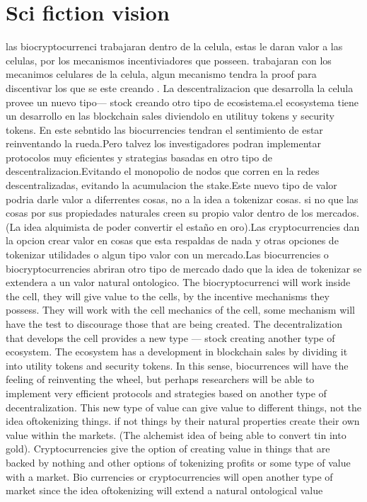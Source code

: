 \documentclass{article}
\begin{document}
\section{Sci fiction vision}
\label{sec:headings}
las biocryptocurrenci trabajaran dentro de la celula, estas le daran valor a las celulas, por los mecanismos incentiviadores que posseen.
trabajaran con los mecanimos celulares de la celula, algun mecanismo tendra la proof  para discentivar los que se este creando  . La descentralizacion que desarrolla la celula provee un nuevo tipo--- stock creando otro tipo de ecosistema.el ecosystema tiene un desarrollo en las blockchain sales diviendolo en utilituy tokens y security tokens. En este sebntido las biocurrencies tendran el sentimiento de estar reinventando la rueda.Pero talvez los investigadores podran implementar protocolos muy eficientes y strategias basadas en otro tipo de descentralizacion.Evitando el monopolio de nodos que corren en la redes descentralizadas, evitando la acumulacion the stake.Este nuevo tipo de valor podria darle valor a diferrentes cosas, no a la idea a tokenizar cosas. si no que las cosas por sus propiedades naturales creen su propio valor dentro de los mercados.(La idea alquimista de poder convertir el estaño en oro).Las cryptocurrencies dan la opcion crear valor en cosas que esta respaldas de nada y otras opciones de tokenizar utilidades o algun tipo valor con un mercado.Las biocurrencies o biocryptocurrencies abriran otro tipo de mercado dado que la idea de tokenizar se extendera a un valor natural ontologico.
The biocryptocurrenci will work inside the cell, they will give value to the cells, by the incentive mechanisms they possess.
They will work with the cell mechanics of the cell, some mechanism will have the test to discourage those that are being created. The decentralization that develops the cell provides a new type --- stock creating another type of ecosystem. The ecosystem has a development in blockchain sales by dividing it into utility tokens and security tokens. In this sense, biocurrences will have the feeling of reinventing the wheel, but perhaps researchers will be able to implement very efficient protocols and strategies based on another type of decentralization. This new type of value can give value to different things, not the idea of ​​tokenizing things. if not things by their natural properties create their own value within the markets. (The alchemist idea of ​​being able to convert tin into gold). Cryptocurrencies give the option of creating value in things that are backed by nothing and other options of tokenizing profits or some type of value with a market. Bio currencies or cryptocurrencies will open another type of market since the idea of ​​tokenizing will extend a natural ontological value




\end{document}
